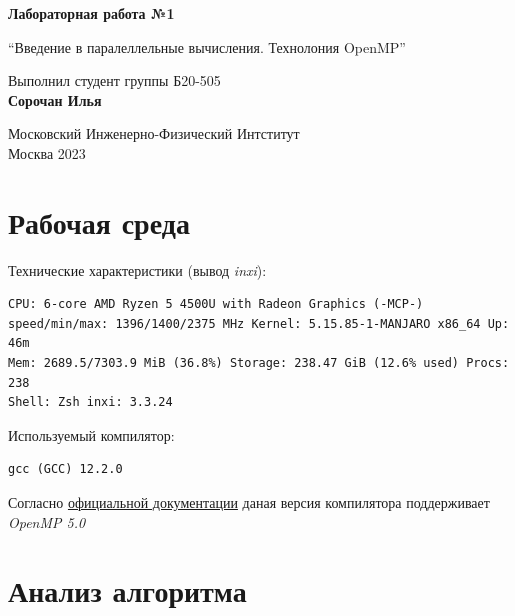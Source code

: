 \documentclass[a4paper, 12pt]{article}
\begin{document}
\hypersetup{pageanchor=false}
\begin{titlepage}
 \begin{center}
  \vspace*{1cm}

  \Huge
  \textbf{Лабораторная работа №1}

  \vspace{0.5cm}
  \LARGE
  ``Введение в паралеллельные вычисления. Технолония OpenMP''

  \vspace{1.5cm}
  Выполнил студент группы Б20-505\\
  \textbf{Сорочан Илья}

  \vfill

  \Large
  Московский Инженерно-Физический Интститут\\
  Москва 2023

 \end{center}
\end{titlepage}



\section{Рабочая среда}

Технические характеристики (вывод \textit{inxi}):
\begin{verbatim}
CPU: 6-core AMD Ryzen 5 4500U with Radeon Graphics (-MCP-)
speed/min/max: 1396/1400/2375 MHz Kernel: 5.15.85-1-MANJARO x86_64 Up: 46m
Mem: 2689.5/7303.9 MiB (36.8%) Storage: 238.47 GiB (12.6% used) Procs: 238
Shell: Zsh inxi: 3.3.24
\end{verbatim}

Используемый компилятор:
\begin{verbatim}
gcc (GCC) 12.2.0
\end{verbatim}

Согласно \href{https://www.openmp.org/resources/openmp-compilers-tools/}{официальной документации} даная версия компилятора поддерживает \textit{OpenMP 5.0}


\section{Анализ алгоритма}
\end{document}
